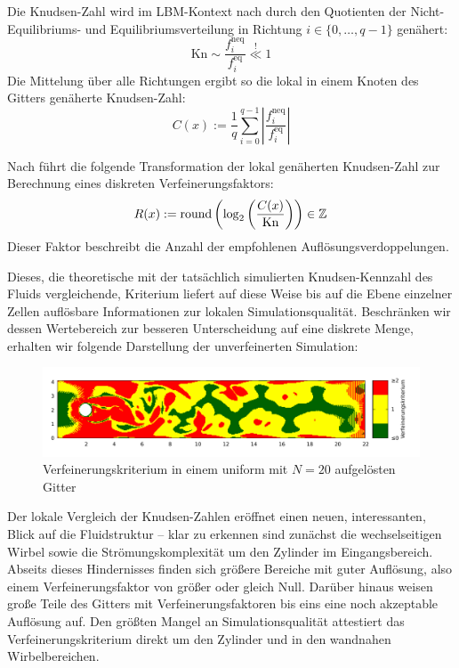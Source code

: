 \begin{Definition}
Die Knudsen-Zahl wird im LBM-Kontext nach \cite[vgl.~(21)]{Lagrava15} durch den Quotienten der Nicht-Equilibriums- und Equilibriumsverteilung in Richtung \(i \in \{0,\dots,q-1\}\) genähert:
\[\text{Kn} \sim \frac{f_i^\text{neq}}{f_i^\text{eq}} \overset{!}{\ll} 1 \]
Die Mittelung über alle Richtungen ergibt so die lokal in einem Knoten des Gitters genäherte Knudsen-Zahl:
\[C(x) := \frac{1}{q} \sum_{i=0}^{q-1} \left|\frac{f_i^\text{neq}}{f_i^\text{eq}}\right|\]
\end{Definition}

\begin{Definition}
Nach \cite[vgl.~(29)]{Lagrava15} führt die folgende Transformation der lokal genäherten Knudsen-Zahl zur Berechnung eines diskreten Verfeinerungsfaktors:
\[ R(x) := \text{round}\left( \log_2 \left( \frac{C(x)}{\text{Kn}} \right) \right) \in \mathbb{Z} \]
Dieser Faktor beschreibt die Anzahl der empfohlenen Auflösungsverdoppelungen.
\end{Definition}

Dieses, die theoretische mit der tatsächlich simulierten Knudsen-Kennzahl des Fluids vergleichende, Kriterium liefert auf diese Weise bis auf die Ebene einzelner Zellen auflösbare Informationen zur lokalen Simulationsqualität. Beschränken wir dessen Wertebereich zur besseren Unterscheidung auf eine diskrete Menge, erhalten wir folgende Darstellung der unverfeinerten Simulation:

\begin{figure}[H]
\begin{adjustbox}{center}
\includegraphics[width=1.2\textwidth]{img/static/cylinder2d_unrefined_n20_re100_16s_knudsen.pdf}
\end{adjustbox}
\caption{Verfeinerungskriterium in einem uniform mit \(N=20\) aufgelösten Gitter}
\label{fig:UnrefinedCylinderKnudsen60s}
\end{figure}

Der lokale Vergleich der Knudsen-Zahlen eröffnet einen neuen, interessanten, Blick auf die Fluidstruktur -- klar zu erkennen sind zunächst die wechselseitigen Wirbel sowie die Strömungskomplexität um den Zylinder im Eingangsbereich. Abseits dieses Hindernisses finden sich größere Bereiche mit guter Auflösung, also einem Verfeinerungsfaktor von größer oder gleich Null. Darüber hinaus weisen große Teile des Gitters mit Verfeinerungsfaktoren bis eins eine noch akzeptable Auflösung auf. Den größten Mangel an Simulationsqualität attestiert das Verfeinerungskriterium direkt um den Zylinder und in den wandnahen Wirbelbereichen.

